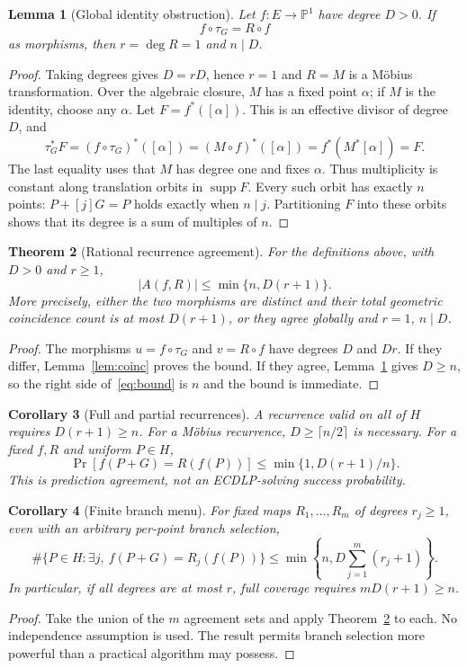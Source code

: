\documentclass[11pt,letterpaper]{article}
\newtheorem{theorem}{Theorem}[section]
\newtheorem{lemma}[theorem]{Lemma}
\newtheorem{corollary}[theorem]{Corollary}
\theoremstyle{definition}
\theoremstyle{remark}
\newcommand{\PP}{\mathbb P}
\newcommand{\supp}{\operatorname{supp}}
\newcommand{\tauG}{\tau_G}
\begin{document}
\begin{lemma}[Global identity obstruction]\label{lem:global}
Let $f:E\to\PP^1$ have degree $D>0$. If
\[
f\circ\tauG=R\circ f
\]
as morphisms, then $r=\deg R=1$ and $n\mid D$.
\end{lemma}
\begin{proof}
Taking degrees gives $D=rD$, hence $r=1$ and $R=M$ is a M\"obius transformation. Over the algebraic closure, $M$ has a fixed point $\alpha$; if $M$ is the identity, choose any $\alpha$. Let $F=f^*([\alpha])$. This is an effective divisor of degree $D$, and
\[
\tauG^*F=(f\circ\tauG)^*([\alpha])
=(M\circ f)^*([\alpha])=f^*(M^*[\alpha])=F.
\]
The last equality uses that $M$ has degree one and fixes $\alpha$. Thus multiplicity is constant along translation orbits in $\supp F$. Every such orbit has exactly $n$ points: $P+[j]G=P$ holds exactly when $n\mid j$. Partitioning $F$ into these orbits shows that its degree is a sum of multiples of $n$.
\end{proof}

\begin{theorem}[Rational recurrence agreement]\label{thm:agreement}
For the definitions above, with $D>0$ and $r\ge1$,
\begin{equation}\label{eq:bound}
|A(f,R)|\le\min\{n,D(r+1)\}.
\end{equation}
More precisely, either the two morphisms are distinct and their total geometric coincidence count is at most $D(r+1)$, or they agree globally and $r=1$, $n\mid D$.
\end{theorem}
\begin{proof}
The morphisms $u=f\circ\tauG$ and $v=R\circ f$ have degrees $D$ and $Dr$. If they differ, Lemma~\ref{lem:coinc} proves the bound. If they agree, Lemma~\ref{lem:global} gives $D\ge n$, so the right side of~\eqref{eq:bound} is $n$ and the bound is immediate.
\end{proof}

\begin{corollary}[Full and partial recurrences]\label{cor:prob}
A recurrence valid on all of $H$ requires $D(r+1)\ge n$. For a M\"obius recurrence, $D\ge\lceil n/2\rceil$ is necessary. For a fixed $f,R$ and uniform $P\in H$,
\[
\Pr[f(P+G)=R(f(P))]\le\min\{1,D(r+1)/n\}.
\]
This is prediction agreement, not an ECDLP-solving success probability.
\end{corollary}

\begin{corollary}[Finite branch menu]\label{cor:menu}
For fixed maps $R_1,\ldots,R_m$ of degrees $r_j\ge1$, even with an arbitrary per-point branch selection,
\[
\#\{P\in H:\exists j,\ f(P+G)=R_j(f(P))\}
\le\min\left\{n,D\sum_{j=1}^{m}(r_j+1)\right\}.
\]
In particular, if all degrees are at most $r$, full coverage requires $mD(r+1)\ge n$.
\end{corollary}
\begin{proof}
Take the union of the $m$ agreement sets and apply Theorem~\ref{thm:agreement} to each. No independence assumption is used. The result permits branch selection more powerful than a practical algorithm may possess.
\end{proof}
\end{document}

